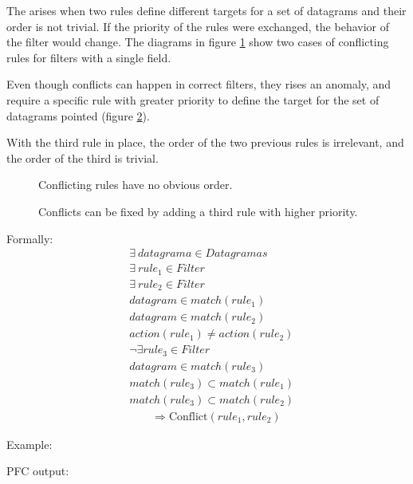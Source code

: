 The  arises when two rules define different targets
for a set of datagrams and their order is not trivial. If the priority of the
rules were exchanged, the behavior of the filter would change. The diagrams in
figure \ref{fig:exrconflict} show two cases of conflicting rules for filters
with a single field.

Even though conflicts can happen in correct filters, they rises an anomaly, and
require a specific rule with greater priority to define the target for the
set of datagrams pointed (figure \ref{fig:exrconflictok}).

With the third rule in place, the order of the two previous rules is irrelevant,
and the order of the third is trivial.

\begin{figure}
	\caption{\label{fig:exrconflict}Conflicting rules have no obvious order.}
\end{figure}

\begin{figure}
	\caption{\label{fig:exrconflictok}Conflicts can be fixed by adding a third
	rule with higher priority.}
\end{figure}

Formally:
\begin{align*}
	& \exists ~ datagrama \in Datagramas \\
	& \exists ~ rule_1 \in Filter \\
	& \exists ~ rule_2 \in Filter \\
	& datagram \in match(rule_1) \\
	& datagram \in match(rule_2) \\
	& action(rule_1) \not= action(rule_2) \\
	& \lnot \exists rule_3 \in Filter \\
	& datagram \in match(rule_3) \\
	& match(rule_3) \subset match(rule_1) \\
	& match(rule_3) \subset match(rule_2) \\
	& \qquad \Rightarrow \mbox{Conflict}(rule_1, rule_2)
\end{align*}

Example:



PFC output:



